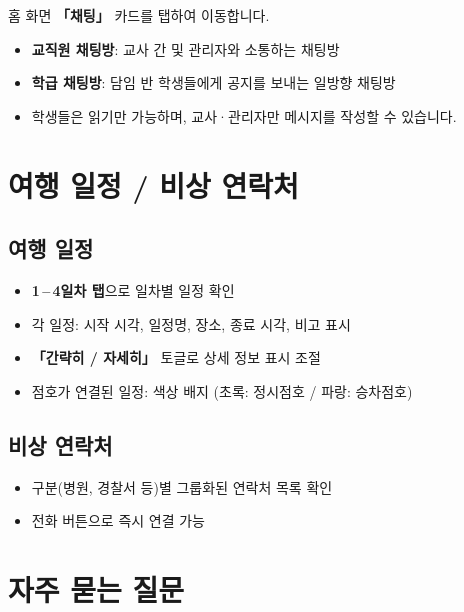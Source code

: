 \documentclass[a4paper,11pt]{article}
\begin{document}
홈 화면 \textbf{「채팅」} 카드를 탭하여 이동합니다.

\begin{itemize}
  \item \textbf{교직원 채팅방}: 교사 간 및 관리자와 소통하는 채팅방
  \item \textbf{학급 채팅방}: 담임 반 학생들에게 공지를 보내는 일방향 채팅방
  \item 학생들은 읽기만 가능하며, 교사·관리자만 메시지를 작성할 수 있습니다.
\end{itemize}

\section{여행 일정 / 비상 연락처}

\subsection{여행 일정}

\begin{itemize}
  \item \textbf{1\,--\,4일차 탭}으로 일차별 일정 확인
  \item 각 일정: 시작 시각, 일정명, 장소, 종료 시각, 비고 표시
  \item \textbf{「간략히 / 자세히」} 토글로 상세 정보 표시 조절
  \item 점호가 연결된 일정: 색상 배지 (초록: 정시점호 / 파랑: 승차점호)
\end{itemize}

\subsection{비상 연락처}

\begin{itemize}
  \item 구분(병원, 경찰서 등)별 그룹화된 연락처 목록 확인
  \item 전화 버튼으로 즉시 연결 가능
\end{itemize}

\section{자주 묻는 질문}
\end{document}
